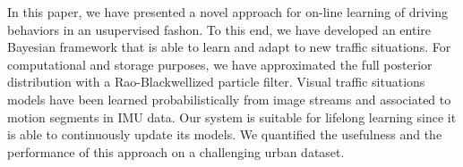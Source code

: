 In this paper, we have presented a novel approach for on-line learning of driving
behaviors in an usupervised fashon. To this end, we have developed an entire Bayesian framework that is
able to learn and adapt to new traffic situations. For computational and storage
purposes, we have approximated the full posterior distribution with a
Rao-Blackwellized particle filter. Visual traffic situations models have been learned
probabilistically from image streams and associated to motion segments in IMU data. Our
system is suitable for lifelong learning since it is able to continuously update
its models. 
We quantified the usefulness and the performance of this approach on a challenging 
urban dataset.

% 
% 
